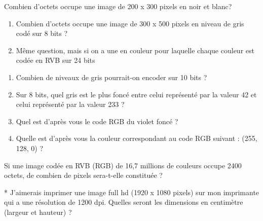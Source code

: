 \documentclass[11pt, a4paper]{book}
\begin{document}
\begin{exercice}
    
Combien d’octets occupe une image de 200 x 300 pixels en noir et blanc?
\end{exercice}

\begin{exercice}
\begin{enumerate}
\item 
    Combien d'octets occupe une image de 300 x 500 pixels en niveau de gris codé sur 8 bits ?
      \item
        Même question, mais si on a une en couleur pour laquelle chaque couleur est codée en RVB sur 24 bits
\end{enumerate}

\end{exercice}


\begin{exercice}
\begin{enumerate}
    \item Combien de niveaux de gris pourrait-on encoder sur 10 bits ?
    
    \item Sur 8 bits, quel gris est le plus foncé entre celui représenté par la valeur 42 et celui représenté par la valeur 233 ? 

    \item Quel est d'après vous le code RGB du violet foncé ? %

    \item Quelle est d'après vous la couleur correspondant au code RGB suivant : (255, 128, 0) ? %
\end{enumerate}
\end{exercice}

\begin{exercice}
Si une image codée en RVB (RGB) de 16,7 millions de couleurs occupe 2400 octets, de combien de pixels sera-t-elle constituée ?
\end{exercice}


\begin{exercice}
 * J’aimerais imprimer une image full hd (1920 x 1080 pixels) sur mon imprimante qui a une résolution de 1200 dpi. 
Quelles seront les dimensions en centimètre (largeur et hauteur) ?

\end{exercice}
\end{document}
